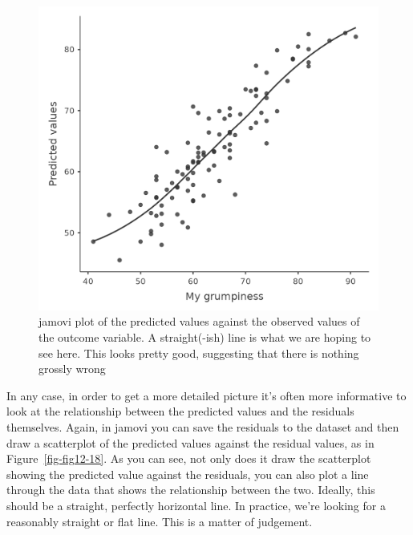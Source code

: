 \documentclass[
  a4paper,
]{book}
\begin{document}
\begin{figure}

\includegraphics[width=1\textwidth,height=\textheight]{images/fig12-17.png} \hfill{}

\caption{\label{fig-fig12-17}jamovi plot of the predicted values against
the observed values of the outcome variable. A straight(-ish) line is
what we are hoping to see here. This looks pretty good, suggesting that
there is nothing grossly wrong}

\end{figure}

In any case, in order to get a more detailed picture it's often more
informative to look at the relationship between the predicted values and
the residuals themselves. Again, in jamovi you can save the residuals to
the dataset and then draw a scatterplot of the predicted values against
the residual values, as in Figure~\ref{fig-fig12-18}. As you can see,
not only does it draw the scatterplot showing the predicted value
against the residuals, you can also plot a line through the data that
shows the relationship between the two. Ideally, this should be a
straight, perfectly horizontal line. In practice, we're looking for a
reasonably straight or flat line. This is a matter of judgement.
\end{document}
